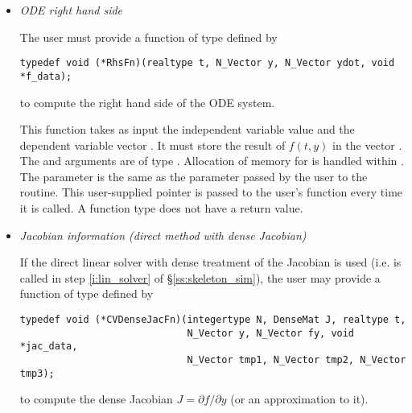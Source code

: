 \begin{itemize}
%
%
\item {\em ODE right hand side}

  The user must provide a function of type  defined by
\begin{verbatim}
typedef void (*RhsFn)(realtype t, N_Vector y, N_Vector ydot, void *f_data);
\end{verbatim}
  to compute the right hand side of the ODE system.
  
  This function takes as input the independent variable  
  value  and the dependent variable vector .  It must store the    
  result of $f(t,y)$ in the vector .  The  and  arguments 
  are of type . Allocation of memory for  is handled within {\cvode}.
  The  parameter is the same as the  parameter passed by 
  the user to the  routine. This user-supplied pointer is passed to 
  the user's  function every time it is called.                                       
  A  function type does not have a return value.                        
%
%
\item {\em Jacobian information (direct method with dense Jacobian)}
  \label{p:djac}
  
  If the direct linear solver with dense treatment of the Jacobian is used 
  (i.e.  is called in step \ref{i:lin_solver} of \S\ref{ss:skeleton_sim}), 
  the user may provide a function of type  defined by
\begin{verbatim}
typedef void (*CVDenseJacFn)(integertype N, DenseMat J, realtype t, 
                             N_Vector y, N_Vector fy, void *jac_data,
                             N_Vector tmp1, N_Vector tmp2, N_Vector tmp3);
\end{verbatim}
  to compute the dense Jacobian $J = \partial f / \partial y$ (or an approximation to it).
  

\end{itemize}
